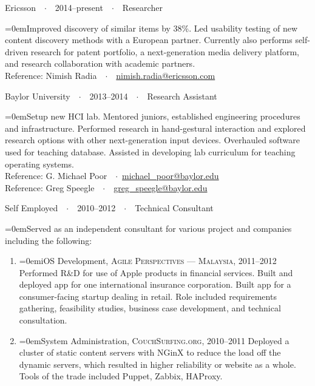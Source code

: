\documentclass[a4paper]{scrartcl}
\newcommand{\Description}[1]{\hangindent=0em\hangafter=0\noindent\footnotesize{#1}\par\normalsize\vspace{1em}} %
\newcommand{\Redvline}[0]{\vspace{0em}\noindent{\color{ThemeColor}\rule{18cm}{0.4pt}}\vspace{-0.5em}}
\newcommand{\MyName}[1]{\noindent{\textsc{\LARGE{\color{ThemeColor}#1}}}} %
\newcommand{\NewBlock}[3]{
    #1\ \ $\cdotp$\ \ #2\ \ $\cdotp$\ \ #3}
\newcommand{\BlockTitle}[1]{\textsc{\vspace{0.15em}}\noindent{\spacedlowsmallcaps{#1}}\vspace{1em}}
\begin{document}

\Redvline

\BlockTitle{Work Experience}

\NewBlock{Ericsson}{2014--present}{Researcher}

\Description{Improved discovery of similar items by 38\%.
Led usability testing of new content discovery methods with a European partner.
Currently also performs self-driven research for patent portfolio, a next-generation media delivery platform, and research collaboration with academic partners.
\\Reference: Nimish Radia\ \ $\cdotp$\ \ \href{mailto:nimish.radia@ericsson.com}{nimish.radia@ericsson.com}}

\NewBlock{Baylor University}{2013--2014}{Research Assistant}

\Description{Setup new HCI lab. Mentored juniors, established engineering procedures and infrastructure. Performed research in hand-gestural interaction and explored research options with other next-generation input devices.
Overhauled software used for teaching database.
Assisted in developing lab curriculum for teaching operating systems.\\
Reference: G. Michael Poor\ \ $\cdotp$\ \href{mailto:michael\_poor@baylor.edu}{michael\_poor@baylor.edu} \\
Reference: Greg Speegle\ \ $\cdotp$\ \ \href{mailto:greg\_speegle@baylor.edu}{greg\_speegle@baylor.edu}}


\NewBlock{Self Employed}{2010--2012}{Technical Consultant}

\Description{Served as an independent consultant for various project and companies including the following:}
\begin{enumerate}
\item[] \Description{iOS Development, \textsc{Agile Perspectives --- Malaysia}, 2011--2012
\newline
Performed R\&D for use of Apple products in financial services. Built and deployed app for one international insurance corporation. Built app for a consumer-facing startup dealing in retail. Role included requirements gathering, feasibility studies, business case development, and technical consultation. }

\item[] \Description{System Administration, \textsc{CouchSurfing.org}, 2010--2011
\newline
Deployed a cluster of static content servers with NGinX to reduce the load off the dynamic servers, which resulted in higher reliability or website as a whole. Tools of the trade included Puppet, Zabbix, HAProxy. }
\end{enumerate}
\end{document}

